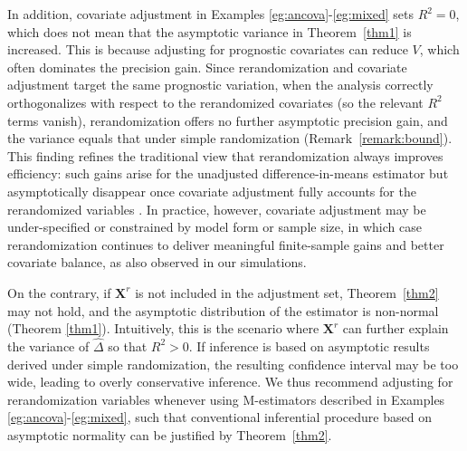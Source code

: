 \documentclass[12pt]{article}
\newcommand{\bX}{\boldsymbol{X}}\newcommand{\bO}{\boldsymbol{O}}
\begin{document}
{In addition, covariate adjustment in Examples \ref{eg:ancova}-\ref{eg:mixed} sets $R^2 = 0$, which does not mean that the asymptotic variance in Theorem~\ref{thm1} is increased. This is because adjusting for prognostic covariates can reduce $V$, which often dominates the precision gain. Since rerandomization and covariate adjustment target the same prognostic variation, when the analysis correctly orthogonalizes with respect to the rerandomized covariates (so the relevant $R^2$ terms vanish), rerandomization offers no further asymptotic precision gain, and the variance equals that under simple randomization (Remark~\ref{remark:bound}). This finding refines the traditional view that rerandomization always improves efficiency: such gains arise for the unadjusted difference-in-means estimator \citep{morgan2012rerandomization} but asymptotically disappear once covariate adjustment fully accounts for the rerandomized variables \citep{li2020rerandomization}. In practice, however, covariate adjustment may be under-specified or constrained by model form or sample size, in which case rerandomization continues to deliver meaningful finite-sample gains and better covariate balance, as also observed in our simulations. %



On the contrary, if $\bX^r$ is not included in the adjustment set, Theorem~\ref{thm2} may not hold, and the asymptotic distribution of the estimator is non-normal (Theorem \ref{thm1}). 
Intuitively, this is the scenario where $\bX^r$ can further explain the variance of $\widehat{\Delta}$ so that $R^2> 0$. If inference is based on asymptotic results derived under simple randomization, the resulting confidence interval may be too wide, leading to overly conservative inference.
We thus recommend adjusting for rerandomization variables whenever using M-estimators described in Examples  \ref{eg:ancova}-\ref{eg:mixed}, such that conventional inferential procedure based on asymptotic normality can be justified by Theorem~\ref{thm2}.


}
\end{document}
